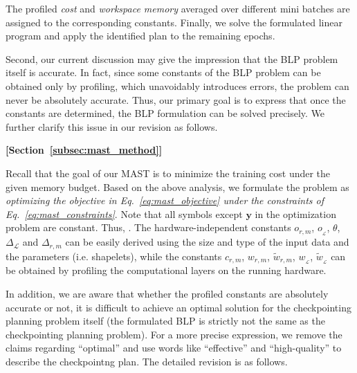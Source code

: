 \begin{sloppypar}
\begin{framed}
The profiled \textit{cost} and \textit{workspace memory} averaged over different mini batches are assigned to the corresponding constants. Finally, we solve the formulated linear program and apply the identified plan to the remaining epochs. 
\end{framed}

Second, our current discussion may give the impression that the BLP problem itself is accurate. In fact, since some constants of the BLP problem can be obtained only by profiling, which unavoidably introduces errors, the problem can never be absolutely accurate. Thus, our primary goal is to express that once the constants are determined, the BLP formulation can be solved precisely. We further clarify this issue in our revision as follows.

\begin{framed}
    \textbf{[Section~\ref{subsec:mast_method}]}

    Recall that the goal of our MAST is to minimize the training cost under the given memory budget. Based on the above analysis, we formulate the problem as \textit{optimizing the objective in Eq.~\eqref{eq:mast_objective} under the constraints of Eq.~\eqref{eq:mast_constraints}}. Note that all symbols except $\boldsymbol{y}$ in the optimization problem are constant. Thus, . The hardware-independent constants $o_{r,m}$, $o_{_{
\mathcal{L}
}}$, $\theta$, $\Delta_{\mathcal{L}}$ and $\Delta_{r,m}$ can be easily derived using the size and type of the input data and the parameters (i.e. shapelets), while the constants $c_{r,m}$, $w_{r,m}$, $\tilde w_{r,m}$, $w_{_{\mathcal{L}}}$, $\tilde w_{_\mathcal{L}}$ can be obtained by profiling the computational layers on the running hardware. 
\end{framed}

In addition, we are aware that whether the profiled constants are absolutely accurate or not, it is difficult to achieve an optimal solution for the checkpointing planning problem itself (the formulated BLP is strictly not the same as the checkpointing planning problem). For a more precise expression, we remove the claims regarding ``optimal'' and use words like ``effective'' and ``high-quality'' to describe the checkpointng plan. The detailed revision is as follows.


\end{sloppypar}
